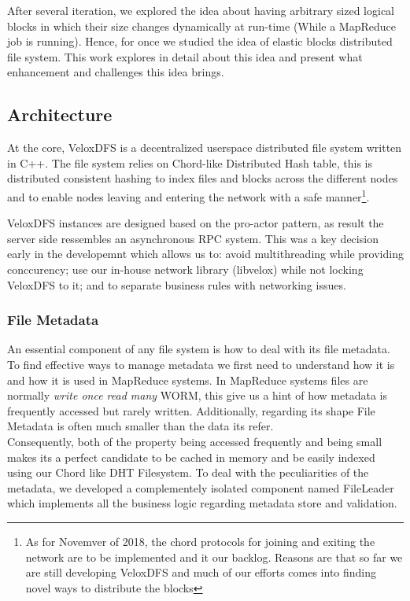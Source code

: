 After several iteration, we explored the idea about having arbitrary sized logical blocks in which their size changes dynamically at run-time (While a MapReduce job is running). Hence, for once we studied the idea of elastic blocks distributed file system. This work explores in detail about this idea and present what enhancement and challenges this idea brings.


\subsection{Architecture}
At the core, VeloxDFS is a decentralized userspace distributed file system written in C++. The file system relies on Chord-like Distributed Hash table, this is distributed consistent hashing to index files and blocks across the different nodes and to enable nodes leaving and entering the network with a safe manner\footnote{As for Novemver of 2018, the chord protocols for joining and exiting the network are to be implemented and it our backlog. Reasons are that so far we are still developing VeloxDFS and much of our efforts comes into finding novel ways to distribute the blocks}.


VeloxDFS instances are designed based on the pro-actor pattern, as result the server side ressembles an asynchronous RPC system. This was a key decision early in the developemnt which allows us to: avoid multithreading while providing conccurency; use our in-house network library (libvelox) while not locking VeloxDFS to it; and to separate business rules with networking issues. \\

\subsubsection{File Metadata}
An essential component of any file system is how to deal with its file metadata. To find effective ways to manage metadata we first need to understand how it is and how it is used in MapReduce systems. In MapReduce systems files are normally \textit{write once read many} WORM, this give us a hint of how metadata is frequently accessed but rarely written. Additionally, regarding its shape File Metadata is often much smaller than the data its refer.\\ 

Consequently, both of the property being accessed frequently and being small makes its a perfect candidate to be cached in memory and be easily indexed using our Chord like DHT Filesystem. To deal with the peculiarities of the metadata, we developed a complementely isolated component named FileLeader which implements all the business logic regarding metadata store and validation. 

